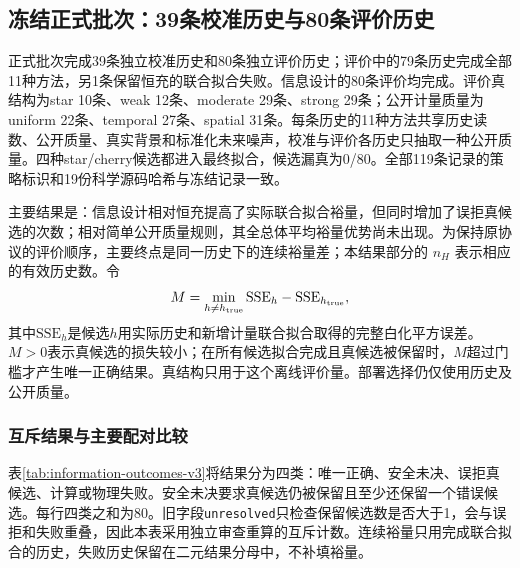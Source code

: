 \documentclass[UTF8,fontset=fandol,11pt,a4paper]{ctexart}
\begin{document}

\subsection{冻结正式批次：39条校准历史与80条评价历史}
\label{sec:information-frozen-results}
正式批次完成39条独立校准历史和80条独立评价历史；评价中的79条历史完成全部11种方法，另1条保留恒充的联合拟合失败。信息设计的80条评价均完成。评价真结构为star 10条、weak 12条、moderate 29条、strong 29条；公开计量质量为uniform 22条、temporal 27条、spatial 31条。每条历史的11种方法共享历史读数、公开质量、真实背景和标准化未来噪声，校准与评价各历史只抽取一种公开质量。四种star/cherry候选都进入最终拟合，候选漏真为0/80。全部119条记录的策略标识和19份科学源码哈希与冻结记录一致。

主要结果是：信息设计相对恒充提高了实际联合拟合裕量，但同时增加了误拒真候选的次数；相对简单公开质量规则，其全总体平均裕量优势尚未出现。为保持原协议的评价顺序，主要终点是同一历史下的连续裕量差；本结果部分的 $n_H$ 表示相应的有效历史数。令
\begin{equation}
 M=\min_{h\ne h_{\rm true}}\mathrm{SSE}_h-\mathrm{SSE}_{h_{\rm true}},
 \label{eq:information-actual-margin-v3}
\end{equation}
其中$\mathrm{SSE}_h$是候选$h$用实际历史和新增计量联合拟合取得的完整白化平方误差。$M>0$表示真候选的损失较小；在所有候选拟合完成且真候选被保留时，$M$超过门槛才产生唯一正确结果。真结构只用于这个离线评价量。部署选择仍仅使用历史及公开质量。

\subsubsection{互斥结果与主要配对比较}
表\ref{tab:information-outcomes-v3}将结果分为四类：唯一正确、安全未决、误拒真候选、计算或物理失败。安全未决要求真候选仍被保留且至少还保留一个错误候选。每行四类之和为80。旧字段\texttt{unresolved}只检查保留候选数是否大于1，会与误拒和失败重叠，因此本表采用独立审查重算的互斥计数。连续裕量只用完成联合拟合的历史，失败历史保留在二元结果分母中，不补填裕量。
\end{document}
